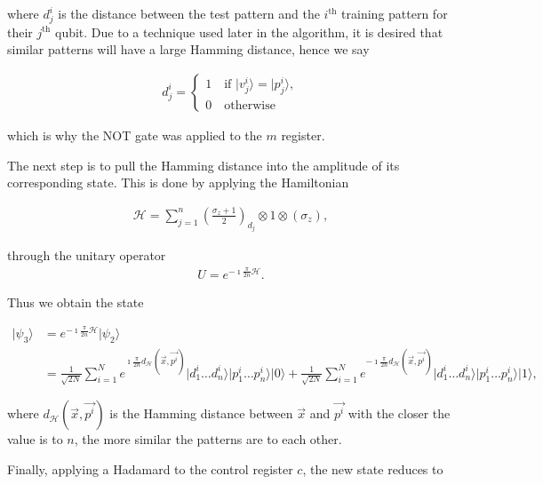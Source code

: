 \noindent where $d_j^i$ is the distance between the test pattern and the $i^{\textrm{th}}$ training pattern for their $j^{\textrm{th}}$ qubit. Due to a technique used later in the algorithm, it is desired that similar patterns will have a large Hamming distance, hence we say

\begin{align*}
    d_j^i =
    \begin{cases}
        1 \quad \textrm{if } \vert v_j^i \rangle = \vert p_j^i \rangle,\\
        0 \quad \textrm{otherwise}
    \end{cases}
\end{align*}

\noindent which is why the \textrm{NOT} gate was applied to the $m$ register.

The next step is to pull the Hamming distance into the amplitude of its corresponding state. This is done by applying the Hamiltonian

\begin{align*}
    \mathcal{H} = \sum\limits_{j=1}^{n}\left(\frac{\sigma_z + 1}{2}\right)_{d_j} \otimes 1 \otimes \left(\sigma_z\right),
\end{align*}

\noindent through the unitary operator 
\begin{align*}
    U = e^{-\imath \frac{\pi}{2n}\mathcal{H}}.
\end{align*}

Thus we obtain the state

\begin{align*}
    \vert \psi_3 \rangle &= e^{-\imath \frac{\pi}{2n}\mathcal{H}} \vert \psi_2 \rangle \\
    &= \frac{1}{\sqrt{2N}}\sum\limits_{i=1}^{N} e^{\imath \frac{\pi}{2n}d_\mathcal{H}\left(\Vec{x},\vec{p^i}\right)} \vert d_1^i\dots d_n^i\rangle\vert p_{1}^{i}\dots p_{n}^{i}\rangle \vert 0 \rangle + \frac{1}{\sqrt{2N}}\sum\limits_{i=1}^{N} e^{-\imath \frac{\pi}{2n}d_\mathcal{H}\left(\Vec{x},\Vec{p^i}\right)} \vert d_1^i\dots d_n^i\rangle\vert p_{1}^{i}\dots p_{n}^{i}\rangle \vert 1 \rangle,
\end{align*}

\noindent where $d_\mathcal{H}\left(\Vec{x},\Vec{p^i}\right)$ is the Hamming distance between $\Vec{x}$ and $\Vec{p^i}$ with the closer the value is to $n$, the more similar the patterns are to each other.

Finally, applying a Hadamard to the control register $c$, the new state reduces to

